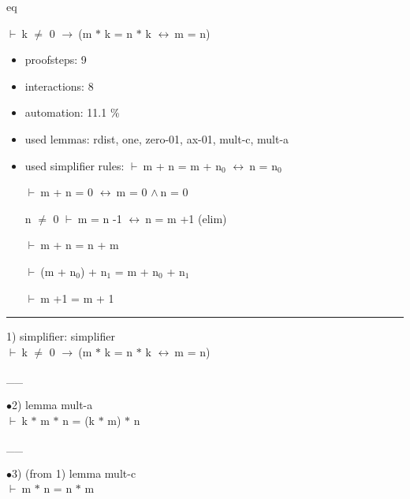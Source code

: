 \documentclass[a4paper]{article}
\newcommand{\Fol}{\mbox{$\vdash\ $}}
\newcommand{\And}{\mbox{$\wedge\ $}}
\newcommand{\Imp}{\mbox{$\rightarrow\ $}}
\newcommand{\Equiv}{\mbox{$\leftrightarrow\ $}}
\begin{document}
\raggedright
              



\begin{minipage}{\textwidth}
\begin{center}

\end{center}
\end{minipage}

\vspace{5ex}

{\Huge eq}

\vspace{5ex}

 \Fol k $\neq$ 0 \Imp (m $*$ k = n $*$ k \Equiv m = n)

\begin{itemize}
\item proofsteps: 9
\item interactions: 8
\item automation: 11.1 \%
\item used lemmas: rdist, one, zero-01, ax-01, mult-c, mult-a 
\item used simplifier rules:
 \Fol m + n = m + $\mbox{n}_{0}$ \Equiv n = $\mbox{n}_{0}$

 \Fol m + n = 0 \Equiv m = 0 \And n = 0

n $\neq$ 0 \Fol m = n -1 \Equiv n = m +1 (elim)

 \Fol m + n = n + m

 \Fol (m + $\mbox{n}_{0}$) + $\mbox{n}_{1}$ = m + $\mbox{n}_{0}$ + $\mbox{n}_{1}$

 \Fol m +1 = m + 1



               \end{itemize}



\vspace{3ex}\rule{1\textwidth}{1mm}


1) simplifier: simplifier \\
 \Fol k $\neq$ 0 \Imp (m $*$ k = n $*$ k \Equiv m = n)

\vspace{-1.5ex}\_\hrulefill \_

$\bullet$2) lemma mult-a \\
 \Fol k $*$ m $*$ n = (k $*$ m) $*$ n

\vspace{-1.5ex}\_\hrulefill \_

$\bullet$3)  (from 1) lemma mult-c \\
 \Fol m $*$ n = n $*$ m
\end{document}
